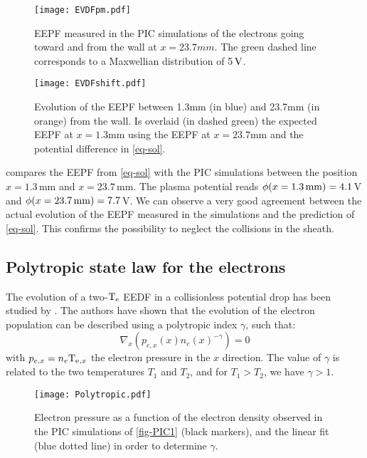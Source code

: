     \begin{figure}[!hbt]
      \centering
      \texttt{[image: EVDFpm.pdf]}
      \caption{EEPF measured in the PIC simulations of the electrons going toward and from the wall at $x=23.7mm$. The green dashed line corresponds to a Maxwellian distribution of 5${\mathrm{\,V}}$.}
      \label{fig-EVDFpm}
    \end{figure}

    \begin{figure}[!hbt]
      \centering
      \texttt{[image: EVDFshift.pdf]}
      \caption{Evolution of the EEPF between 1.3mm (in blue) and 23.7mm (in orange) from the wall. Is overlaid (in dashed green) the expected  EEPF at $x=1.3$mm using the EEPF at $x=23.7$mm and the potential difference in \cref{eq-sol}. }
      \label{fig-PICEEPF}
    \end{figure}

     compares the EEPF from \cref{eq-sol} with the \ac{PIC} simulations between the position $x=1.3$\,mm and $x=23.7$\,mm.
    The plasma potential reads $\phi(x=1.3\,{\rm mm})=4.1$\,V and  $\phi(x=23.7\,{\rm mm})=7.7$\,V.
    We can observe a very good agreement between the actual evolution of the EEPF measured in the simulations and the prediction of \cref{eq-sol}.
    This confirms the possibility to neglect the collisions in the sheath.

  \subsection{Polytropic state law for the electrons}

    The evolution of a two-$\mathrm{T_e}$ EEDF  in a collisionless potential drop has been studied by \citet{zhang2016}.
    The authors have shown that the evolution of the electron population can be described using a polytropic index $\gamma$, such that\string:
    \begin{equation}
      \label{eq-poly}
      \nabla_x \left( p_{e,x}(x) n_e(x)^{-\gamma} \right)= 0
    \end{equation}
    with $p_{e,x}=n_e \mathrm{T_e}{}_{,x}$ the electron pressure in the $x$ direction.
    The value of $\gamma$ is related to the two temperatures $T_1$ and $T_2$, and for $T_1 > T_2$, we have $\gamma > 1 $.




    \begin{figure}[!htb]
      \centering
      \texttt{[image: Polytropic.pdf]}
      \caption{Electron pressure as a function of the electron density observed in the PIC simulations of \cref{fig-PIC1} (black markers), and the linear fit (blue dotted line) in order to determine $\gamma$.}
      \label{fig-polyFit}
    \end{figure}

